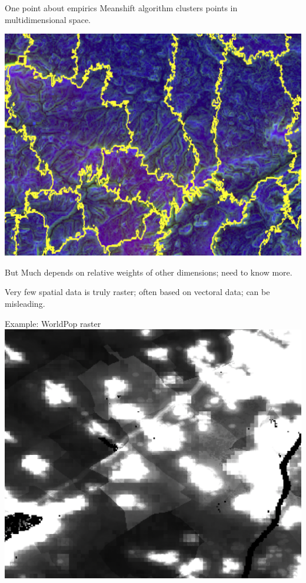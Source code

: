 \documentclass[
  ignorenonframetext,
  aspectratio=16,
]{beamer}
\begin{document}
\begin{frame}{One point about empirics}
\protect\hypertarget{one-point-about-empirics-1}{}
Meanshift algorithm clusters points in multidimensional space.

\includegraphics{clusters.png}

\begin{block}{But}
\protect\hypertarget{but}{}
Much depends on relative weights of other dimensions; need to know more.

Very few spatial data is truly raster; often based on vectoral data; can
be misleading.
\end{block}
\end{frame}

\begin{frame}{Example: WorldPop raster}
\protect\hypertarget{example-worldpop-raster}{}
\includegraphics{raster.png}
\end{frame}
\end{document}
